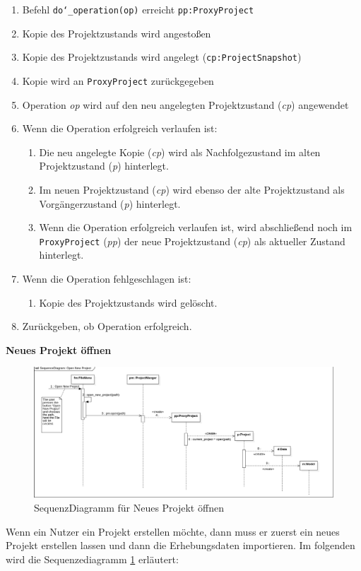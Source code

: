 \documentclass{article}
\begin{document}
\begin{enumerate}
    \item[1.] Befehl \texttt{do\char`_operation(op)} erreicht \texttt{pp:ProxyProject}
    \item[2.] Kopie des Projektzustands wird angestoßen
    \item[3.] Kopie des Projektzustands wird angelegt (\texttt{cp:ProjectSnapshot})
    \item[4.] Kopie wird an \texttt{ProxyProject} zurückgegeben
    \item[4.5.] Operation \emph{op} wird auf den neu angelegten Projektzustand (\emph{cp}) angewendet
    \item[] Wenn die Operation erfolgreich verlaufen ist:
    \begin{enumerate}
        \item[5.] Die neu angelegte Kopie (\emph{cp}) wird als Nachfolgezustand im alten Projektzustand (\emph{p}) hinterlegt.
        \item[7.] Im neuen Projektzustand (\emph{cp}) wird ebenso der alte Projektzustand als Vorgängerzustand (\emph{p}) hinterlegt.
        \item[9.] Wenn die Operation erfolgreich verlaufen ist, wird abschließend noch im \texttt{ProxyProject} (\emph{pp}) der neue Projektzustand (\emph{cp}) als aktueller Zustand hinterlegt.
    \end{enumerate}
    \item[] Wenn die Operation fehlgeschlagen ist:
    \begin{enumerate}
        \item[11.] Kopie des Projektzustands wird gelöscht.
    \end{enumerate}
    \item[12.] Zurückgeben, ob Operation erfolgreich.
    
\end{enumerate}

\textbf{\large{Neues Projekt öffnen}}
\begin{figure}[H]%
    \includegraphics[width=15cm]{entwurf/Entwurf_dokument/img/Alissa/SQOpenNewProject3.png}
    \caption{SequenzDiagramm für Neues Projekt öffnen}
    \label{sq:opernNewProject}
\end{figure}
Wenn ein Nutzer ein Projekt erstellen möchte, dann muss er zuerst ein neues Projekt erstellen lassen und dann die Erhebungsdaten importieren. Im folgenden wird die Sequenzediagramm \ref{sq:opernNewProject} erläutert:
\end{document}
